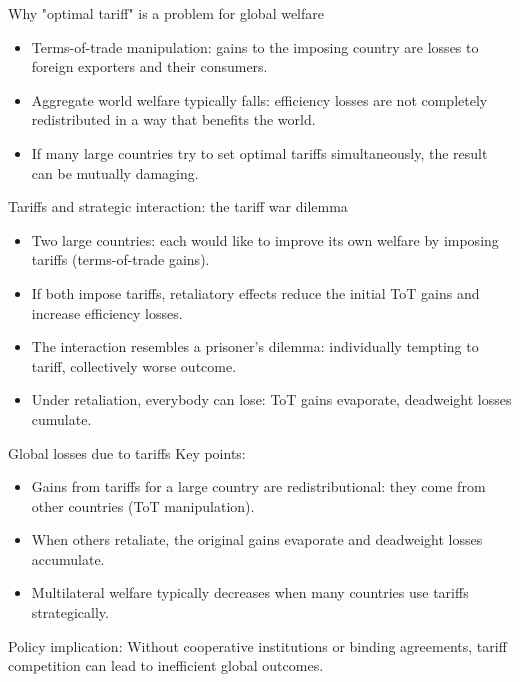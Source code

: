 \documentclass[notes,11pt, aspectratio=169, xcolor=table]{beamer}
\begin{document}
\begin{frame}{Why "optimal tariff" is a problem for global welfare}
  \begin{itemize}
    \item Terms-of-trade manipulation: gains to the imposing country are losses to foreign exporters and their consumers.
    \item Aggregate world welfare typically falls: efficiency losses are not completely redistributed in a way that benefits the world.
    \item If many large countries try to set optimal tariffs simultaneously, the result can be mutually damaging.
  \end{itemize}
\end{frame}

\begin{frame}{Tariffs and strategic interaction: the tariff war dilemma}
  \begin{itemize}
    \item Two large countries: each would like to improve its own welfare by imposing tariffs (terms-of-trade gains).
    \item If both impose tariffs, retaliatory effects reduce the initial ToT gains and increase efficiency losses.
    \item The interaction resembles a prisoner's dilemma: individually tempting to tariff, collectively worse outcome.
    \item Under retaliation, everybody can lose: ToT gains evaporate, deadweight losses cumulate.
  \end{itemize}
\end{frame}

\begin{frame}{Global losses due to tariffs}
  Key points:
  \begin{itemize}
    \item Gains from tariffs for a large country are redistributional: they come from other countries (ToT manipulation).
    \item When others retaliate, the original gains evaporate and deadweight losses accumulate.
    \item Multilateral welfare typically decreases when many countries use tariffs strategically.
  \end{itemize}
  Policy implication: Without cooperative institutions or binding agreements, tariff competition can lead to inefficient global outcomes.
\end{frame}
\end{document}
